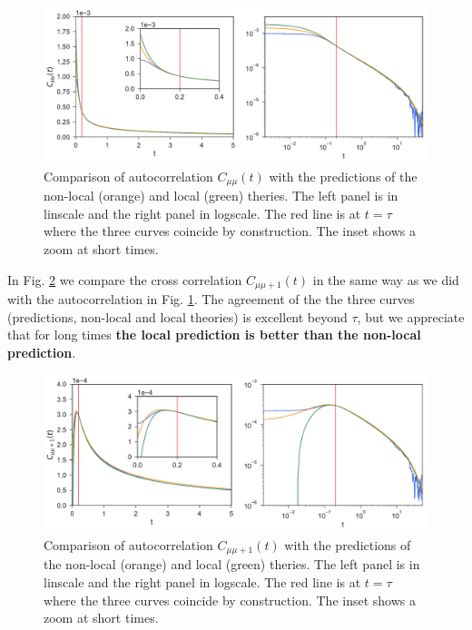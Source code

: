 \documentclass[a4paper,openright,12pt]{book}
\newcommand{\Note}[1]{{\bf \color{red}#1}}    %
\begin{document}
\begin{figure}[h!]
  \centering
\includegraphics[scale=0.45]{Predictionsmumu-PBC}
\caption[Comparison of autocorrelation $C_{\mu\mu}$ with the predicions for PBC system]{Comparison of autocorrelation $C_{\mu\mu}(t)$ with the predictions of the non-local (orange) and local (green) theries. The left panel is in linscale and the right panel in logscale. The red line is at $t=\tau$ where the three curves coincide by construction. The inset shows a zoom at short times.}
\label{fig:Predictionsmumu-PBC}
\end{figure}

In Fig. \ref{fig:Predictionsmumu+1-PBC} we compare the cross correlation $C_{\mu\mu+1}(t)$ in the same way as we did with the autocorrelation in Fig. \ref{fig:Predictionsmumu-PBC}. The agreement of the the three curves (predictions, non-local and local theories) is excellent beyond $\tau$, but we appreciate that for long times \Note{the local prediction is better than the non-local prediction}. 

\begin{figure}[h!]
  \centering
\includegraphics[scale=0.45]{Predictionsmumu+1-PBC}
\caption[Comparison of cross correlation $C_{\mu\mu+1}$ with the predicions for PBC system]{Comparison of autocorrelation $C_{\mu\mu+1}(t)$ with the predictions of the non-local (orange) and local (green) theries. The left panel is in linscale and the right panel in logscale. The red line is at $t=\tau$ where the three curves coincide by construction. The inset shows a zoom at short times.}
\label{fig:Predictionsmumu+1-PBC}
\end{figure}
\end{document}
